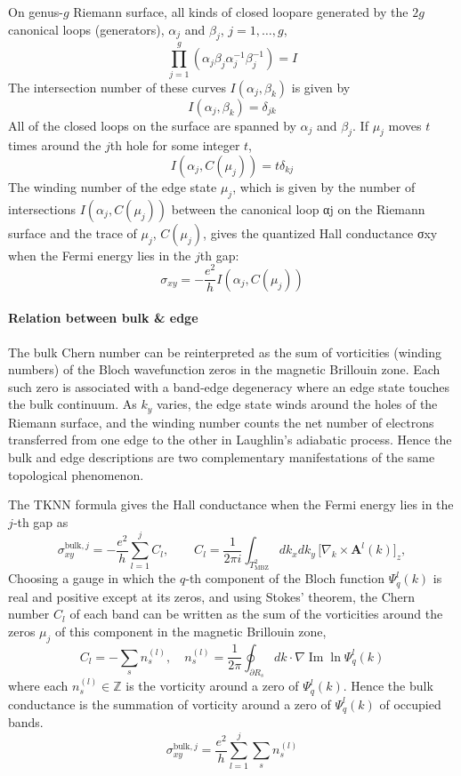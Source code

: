 \documentclass[12pt,a4paper]{article}
\begin{document}
    On genus-$g$ Riemann surface, all kinds of closed loopare generated by the $2g$ canonical loops (generators), $\alpha_j$ and $\beta_j$, $j = 1,\dots,g$,
    \[
        \prod_{j=1}^g \left(\alpha_j\beta_j\alpha_j^{-1}\beta_j^{-1}\right) = I
    \]
    The intersection number of these curves  $I(\alpha_j , \beta_k)$ is given by
    \[
        I(\alpha_j , \beta_k) = \delta_{jk}
    \]
    All of the closed loops on the surface are spanned by $\alpha_j$ and $\beta_j$. If $\mu_j$ moves $t$ times around the $j$th hole for some integer $t$,
    \[
        I(\alpha_j , C(\mu_j)) = t \delta_{kj}
    \]
    The winding number of the edge state $\mu_j$, which is given by the number of intersections $I(\alpha_j , C(\mu_j))$ between the canonical loop αj on the Riemann surface and the trace of $\mu_j$, $C(\mu_j)$, gives the quantized Hall conductance σxy when the Fermi energy lies in the $j$th gap:
    \[
        \sigma_{xy} = -\frac{e^2}{h} I(\alpha_j , C(\mu_j))
    \]

\paragraph{Relation between bulk \& edge}

    The bulk Chern number can be reinterpreted as the sum of vorticities (winding numbers) of the Bloch wavefunction zeros in the magnetic Brillouin zone. Each such zero is associated with a band‑edge degeneracy where an edge state touches the bulk continuum. As $k_{y}$ varies, the edge state winds around the holes of the Riemann surface, and the winding number counts the net number of electrons transferred from one edge to the other in Laughlin’s adiabatic process. Hence the bulk and edge descriptions are two complementary manifestations of the same topological phenomenon.

    The TKNN formula gives the Hall conductance when the Fermi energy lies in the $j$‑th gap as
    \[
    \sigma_{xy}^{\mathrm{bulk},j} = -\frac{e^{2}}{h}\sum_{l=1}^{j} C_{l},
    \qquad
    C_{l} = \frac{1}{2\pi i}\int_{T_{\mathrm{MBZ}}^{2}} dk_{x}dk_{y}\,
    \bigl[\nabla_{k}\times \mathbf{A}^{l}(k)\bigr]_{z},
    \]
    Choosing a gauge in which the $q$‑th component of the Bloch function $\Psi_{q}^{l}(k)$ is real and positive except at its zeros, and using Stokes' theorem, the Chern number $C_l$ of each band can be written as the sum of the vorticities around the zeros $\mu_j$ of this component in the magnetic Brillouin zone,
    \[
        C_{l} = -\sum_{s} n_{s}^{(l)}, \quad
        n_{s}^{(l)} = \frac{1}{2\pi}\oint_{\partial R_{s}} dk\cdot\nabla\operatorname{Im}\ln\Psi_{q}^{l}(k)
    \]
    where each $n_{s}^{(l)}\in\mathbb{Z}$ is the vorticity around a zero of $\Psi_{q}^{l}(k)$. Hence the bulk conductance is the summation of vorticity around a zero of $\Psi_{q}^{l}(k)$ of occupied bands.
    \begin{equation}
    \label{eq:sigma_bulk}
        \sigma_{xy}^{\mathrm{bulk},j} = \frac{e^{2}}{h}\sum_{l=1}^{j}\sum_{s} n_{s}^{(l)}
    \end{equation}
\end{document}
